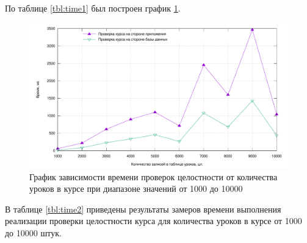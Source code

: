 \pagebreak
По таблице \ref{tbl:time1} был построен график \ref{img:plot1}. 

\begin{figure}[H]
	\centering
	\includegraphics[height=0.35\textheight]{inc/img/plot1.pdf}
	\caption{График зависимости времени проверок целостности от количества уроков в курсе при диапазоне значений от 1000 до 10000}
	\label{img:plot1}
\end{figure}

В таблице \ref{tbl:time2} приведены результаты замеров времени выполнения реализации проверки целостности курса для количества уроков в курсе от 1000 до 10000 штук.

